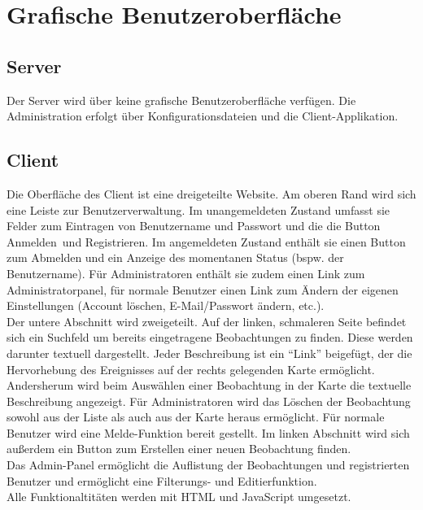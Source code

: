\documentclass[a4paper,11pt]{scrartcl}
\begin{document}
\section{Grafische Benutzeroberfläche}
	\subsection{Server}
		Der Server wird über keine grafische Benutzeroberfläche verfügen. Die Administration erfolgt über Konfigurationsdateien und die Client-Applikation.
	\subsection{Client}
		Die Oberfläche des Client ist eine dreigeteilte Website. Am oberen Rand wird sich eine Leiste zur Benutzerverwaltung. Im unangemeldeten Zustand umfasst sie Felder zum Eintragen von Benutzername und Passwort und die die Button \glqq Anmelden\grqq\ und \glqq Registrieren\grqq . Im angemeldeten Zustand enthält sie einen Button zum Abmelden und ein Anzeige des momentanen Status (bspw. der Benutzername). Für Administratoren enthält sie zudem einen Link zum Administratorpanel, für normale Benutzer einen Link zum Ändern der eigenen Einstellungen (Account löschen, E-Mail/Passwort ändern, etc.).\\
		Der untere Abschnitt wird zweigeteilt. Auf der linken, schmaleren Seite befindet sich ein Suchfeld um bereits eingetragene Beobachtungen zu finden. Diese werden darunter textuell dargestellt. Jeder Beschreibung ist ein “Link” beigefügt, der die Hervorhebung des Ereignisses auf der rechts gelegenden Karte ermöglicht. Andersherum wird beim Auswählen einer Beobachtung in der Karte die textuelle Beschreibung angezeigt. Für Administratoren wird das Löschen der Beobachtung sowohl aus der Liste als auch aus der Karte heraus ermöglicht. Für normale Benutzer wird eine Melde-Funktion bereit gestellt. Im linken Abschnitt wird sich außerdem ein Button zum Erstellen einer neuen Beobachtung finden.\\
		Das Admin-Panel ermöglicht die Auflistung der Beobachtungen und registrierten Benutzer und ermöglicht eine Filterungs- und Editierfunktion.\\
		Alle Funktionaltitäten werden mit HTML und JavaScript umgesetzt.
		
\end{document}
